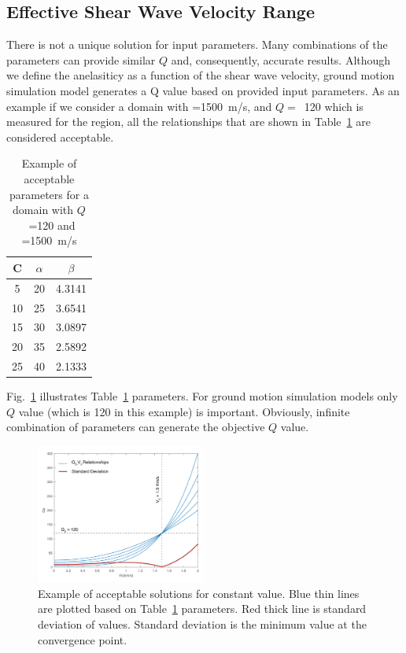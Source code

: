\subsection{Effective Shear Wave Velocity Range}

There is not a unique solution for \qsvs{} input parameters. Many combinations of the parameters can provide similar $Q$ and, consequently, accurate results. Although we define the anelasiticy as a function of the shear wave velocity, ground motion simulation model generates a Q value based on provided input parameters. As an example if we consider a domain with \vs{}=1500~m/s, and $Q=$~120 which is measured for the region, all the \qsvs{} relationships that are shown in Table~\ref{tab:example_effective_vs} are considered acceptable. 

\begin{table}[ht]
\centering
\caption{Example of acceptable parameters for  a domain with $Q$~=120 and \vs{}=1500~m/s}
\label{tab:example_effective_vs}
\begin{tabular}{ccc}
C  & $\alpha$ & $\beta$ \\ \hline
5   & 20                    & 4.3141               \\
10 & 25                    & 3.6541               \\
15 & 30                    & 3.0897               \\
20 & 35                    & 2.5892               \\
25 & 40                    & 2.1333              
\end{tabular}
\end{table}

Fig.~\ref{fig:example_acceptable_parameters} illustrates Table~\ref{tab:example_effective_vs} parameters. For ground motion simulation models only $Q$ value (which is 120 in this example) is important. Obviously, infinite combination of parameters can generate the objective $Q$ value. 

 \begin{figure}[ht]
    \centering
    \includegraphics[width=0.5\textwidth]{figures/pdf/Figure_04.pdf}
    \caption{Example of acceptable solutions for constant \qs{} value. Blue thin lines are plotted based on Table~\ref{tab:example_effective_vs} parameters. Red thick line is standard deviation of \qs{} values. Standard deviation is the minimum value at the convergence point.}
    \label{fig:example_acceptable_parameters}
\end{figure}

